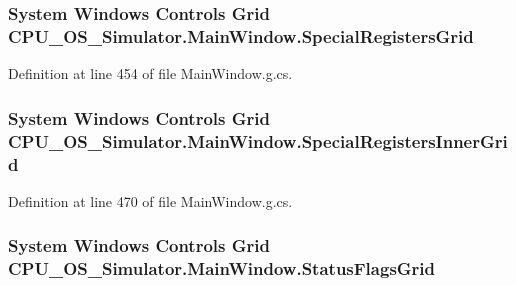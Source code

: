 \subsubsection[{Special\+Registers\+Grid}]{\setlength{\rightskip}{0pt plus 5cm}System Windows Controls Grid C\+P\+U\+\_\+\+O\+S\+\_\+\+Simulator.\+Main\+Window.\+Special\+Registers\+Grid\hspace{0.3cm}{\ttfamily [package]}}\label{class_c_p_u___o_s___simulator_1_1_main_window_a7ce98e44f9236ca31eb5bf3ed81c3372}


Definition at line 454 of file Main\+Window.\+g.\+cs.

\hypertarget{class_c_p_u___o_s___simulator_1_1_main_window_aeef1e97d3e7d589fdab51828260c7b5a}{}
\subsubsection[{Special\+Registers\+Inner\+Grid}]{\setlength{\rightskip}{0pt plus 5cm}System Windows Controls Grid C\+P\+U\+\_\+\+O\+S\+\_\+\+Simulator.\+Main\+Window.\+Special\+Registers\+Inner\+Grid\hspace{0.3cm}{\ttfamily [package]}}\label{class_c_p_u___o_s___simulator_1_1_main_window_aeef1e97d3e7d589fdab51828260c7b5a}


Definition at line 470 of file Main\+Window.\+g.\+cs.

\hypertarget{class_c_p_u___o_s___simulator_1_1_main_window_afdda5e5a39c6e3b99300284ea2640e7c}{}
\subsubsection[{Status\+Flags\+Grid}]{\setlength{\rightskip}{0pt plus 5cm}System Windows Controls Grid C\+P\+U\+\_\+\+O\+S\+\_\+\+Simulator.\+Main\+Window.\+Status\+Flags\+Grid\hspace{0.3cm}{\ttfamily [package]}}\label{class_c_p_u___o_s___simulator_1_1_main_window_afdda5e5a39c6e3b99300284ea2640e7c}


